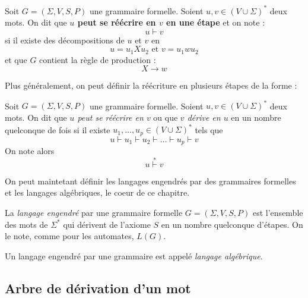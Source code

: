 \begin{definition}
    Soit $ G = (\Sigma, V, S, P)$ une grammaire formelle. Soient $u,v \in \left( V \cup \Sigma \right)^*$ deux mots. 
    On dit que \textbf{$u$ peut se réécrire en $v$ en une étape} et on note :
        \[ u \vdash v \] 
    si il existe des décompositions de $u$ et $v$ en 
        \[ u = u_1 X u_2 \text{ et } v = u_1 w u_2 \] 
    et que $G$ contient la règle de production :
        \[ X \longrightarrow w \] 
\end{definition}

Plus généralement, on peut définir la réécriture en plusieurs étapes de la forme : 

\begin{definition}[Réécriture (2)]
    Soit $ G = (\Sigma, V, S, P)$ une grammaire formelle. Soient $u,v \in \left( V \cup \Sigma \right)^*$ deux mots.
    On dit que \emph{$u$ peut se réécrire en $v$} ou que \emph{$v$ dérive en $u$} en un nombre quelconque de fois si 
    il existe $u_1, \dots, u_p \in \left( V \cup \Sigma \right)^*$ tels que 
        \[ u \vdash u_1 \vdash u_2 \vdash \dots \vdash u_p \vdash v \] 
    On note alors 
        \[ u \overset{*}{\vdash} v \] 
\end{definition}

On peut maintetant définir les langages engendrés par des grammaires formelles et les langages algébriques, le coeur de ce 
chapitre. 

\begin{definition}
    La \emph{langage engendré} par une grammaire formelle $ G = (\Sigma, V, S, P)$ est l'ensemble des mots de $\Sigma^*$ 
    qui dérivent de l'axiome $S$ en un nombre quelconque d'étapes. On le note, comme pour les automates, $L(G)$. 
\end{definition}

\begin{definition}
    Un langage engendré par une grammaire est appelé \emph{langage algébrique}. 
\end{definition}



\subsection{Arbre de dérivation d'un mot}

